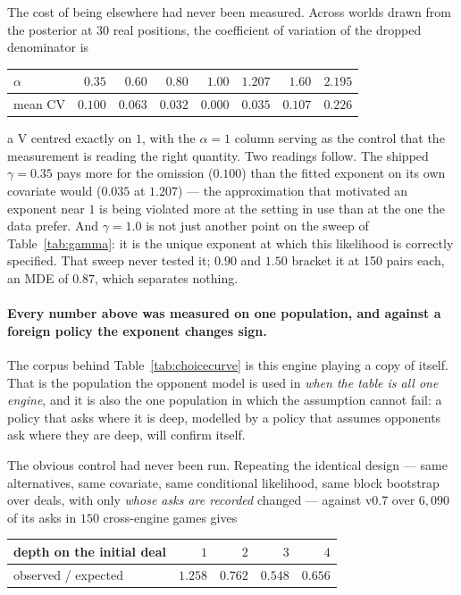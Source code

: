 \documentclass[11pt,a4paper]{article}
\begin{document}
The cost of being elsewhere had never been measured. Across worlds drawn from
the posterior at 30 real positions, the coefficient of variation of the dropped
denominator is

\begin{center}
\small
\begin{tabular}{lrrrrrrr}
\toprule
$\alpha$ & $0.35$ & $0.60$ & $0.80$ & $1.00$ & $1.207$ & $1.60$ & $2.195$ \\
\midrule
mean CV & $0.100$ & $0.063$ & $0.032$ & $\mathbf{0.000}$ & $0.035$ & $0.107$ & $0.226$ \\
\bottomrule
\end{tabular}
\end{center}

a V centred exactly on $1$, with the $\alpha = 1$ column serving as the control
that the measurement is reading the right quantity. Two readings follow. The
shipped $\gamma = 0.35$ pays more for the omission ($0.100$) than the fitted
exponent on its own covariate would ($0.035$ at $1.207$) --- the approximation
that motivated an exponent near $1$ is being violated more at the setting in use
than at the one the data prefer. And $\gamma = 1.0$ is not just another point on
the sweep of Table~\ref{tab:gamma}: it is the unique exponent at which this
likelihood is correctly specified. That sweep never tested it; $0.90$ and $1.50$
bracket it at 150 pairs each, an MDE of $0.87$, which separates nothing.

\paragraph{Every number above was measured on one population, and against a
foreign policy the exponent changes sign.} The corpus behind
Table~\ref{tab:choicecurve} is this engine playing a copy of itself. That is
the population the opponent model is used in \emph{when the table is all one
engine}, and it is also the one population in which the assumption cannot
fail: a policy that asks where it is deep, modelled by a policy that assumes
opponents ask where they are deep, will confirm itself.

The obvious control had never been run. Repeating the identical design ---
same alternatives, same covariate, same conditional likelihood, same block
bootstrap over deals, with only \emph{whose asks are recorded} changed ---
against v0.7 over $6{,}090$ of its asks in $150$ cross-engine games gives

\begin{center}
\small
\begin{tabular}{lrrrr}
\toprule
depth on the initial deal & $1$ & $2$ & $3$ & $4$ \\
\midrule
observed / expected & $1.258$ & $0.762$ & $0.548$ & $0.656$ \\
\bottomrule
\end{tabular}
\end{center}
\end{document}
